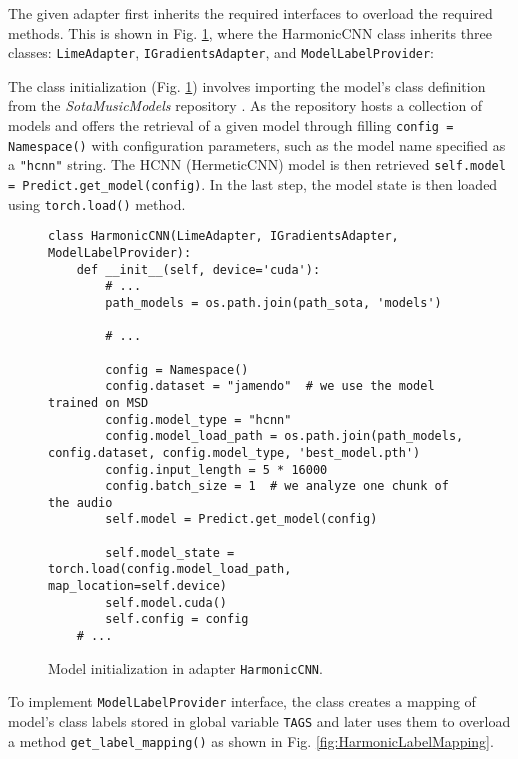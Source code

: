 \documentclass[
    bindingoffset=5mm,  %
    footnoteindent=3mm, %
    hyphenation=true    %
]{src/wut-thesis}
\begin{document}
The given adapter first inherits the required interfaces to overload the required methods.
This is shown in Fig. \ref{fig:HarmonicCNNInit}, where the HarmonicCNN class inherits three classes:
\texttt{LimeAdapter}, \texttt{IGradientsAdapter}, and \texttt{ModelLabelProvider}:

The class initialization (Fig. \ref{fig:HarmonicCNNInit}) involves importing the model’s class definition
from the \textit{SotaMusicModels} repository \cite{Won2020-ej}. As the repository hosts a collection
of models and offers the retrieval of a given model through filling \texttt{config = Namespace()} with
configuration parameters, such as the model name specified as a \texttt{"hcnn"} string.
The HCNN (HermeticCNN) model is then retrieved \texttt{self.model = Predict.get_model(config)}.
In the last step, the model state is then loaded using \texttt{torch.load()} method.

\begin{figure}%
\begin{verbatim}
class HarmonicCNN(LimeAdapter, IGradientsAdapter, ModelLabelProvider):
    def __init__(self, device='cuda'):
        # ...
        path_models = os.path.join(path_sota, 'models')

        # ...

        config = Namespace()
        config.dataset = "jamendo"  # we use the model trained on MSD
        config.model_type = "hcnn"
        config.model_load_path = os.path.join(path_models, config.dataset, config.model_type, 'best_model.pth')
        config.input_length = 5 * 16000
        config.batch_size = 1  # we analyze one chunk of the audio
        self.model = Predict.get_model(config)
        
        self.model_state = torch.load(config.model_load_path, map_location=self.device)
        self.model.cuda()
        self.config = config
    # ...
\end{verbatim}
\caption{Model initialization in adapter \texttt{HarmonicCNN}.}
\label{fig:HarmonicCNNInit}
\end{figure}

To implement \texttt{ModelLabelProvider} interface, the class creates a mapping of model's class
labels stored in global variable \texttt{TAGS} and later uses them to overload
a method \texttt{get_label_mapping()} as shown in Fig. \ref{fig:HarmonicLabelMapping}.
\end{document}
